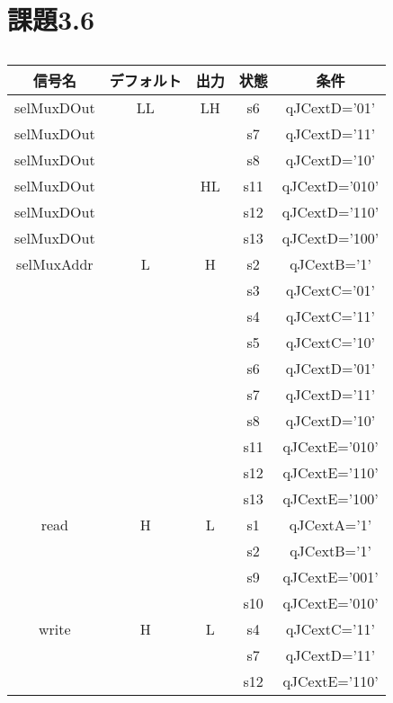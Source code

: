 \documentclass[dvipdfmx]{jarticle}
\begin{document}
\section{課題3.6}
\begin{table}[h]
    \centering
    \begin{tabular}{|c|c|c|c|c|}
    \hline
    信号名&デフォルト&出力&状態&条件\\\hline
    selMuxDOut&LL&LH&s6&qJCextD='01'\\
    selMuxDOut&&&s7&qJCextD='11'\\
    selMuxDOut&&&s8&qJCextD='10'\\
    selMuxDOut&&HL&s11&qJCextD='010'\\
    selMuxDOut&&&s12&qJCextD='110'\\
    selMuxDOut&&&s13&qJCextD='100'\\
    \hline
    selMuxAddr&L&H&s2&qJCextB='1'\\
    &&&s3&qJCextC='01'\\
    &&&s4&qJCextC='11'\\
    &&&s5&qJCextC='10'\\
    &&&s6&qJCextD='01'\\
    &&&s7&qJCextD='11'\\
    &&&s8&qJCextD='10'\\
    &&&s11&qJCextE='010'\\
    &&&s12&qJCextE='110'\\
    &&&s13&qJCextE='100'\\\hline
    read&H&L&s1&qJCextA='1'\\
    &&&s2&qJCextB='1'\\
    &&&s9&qJCextE='001'\\
    &&&s10&qJCextE='010'\\
    \hline
    write&H&L&s4&qJCextC='11'\\
    &&&s7&qJCextD='11'\\
    &&&s12&qJCextE='110'\\
    \hline
    \end{tabular}
    \caption{}
\end{table}
\end{document}
